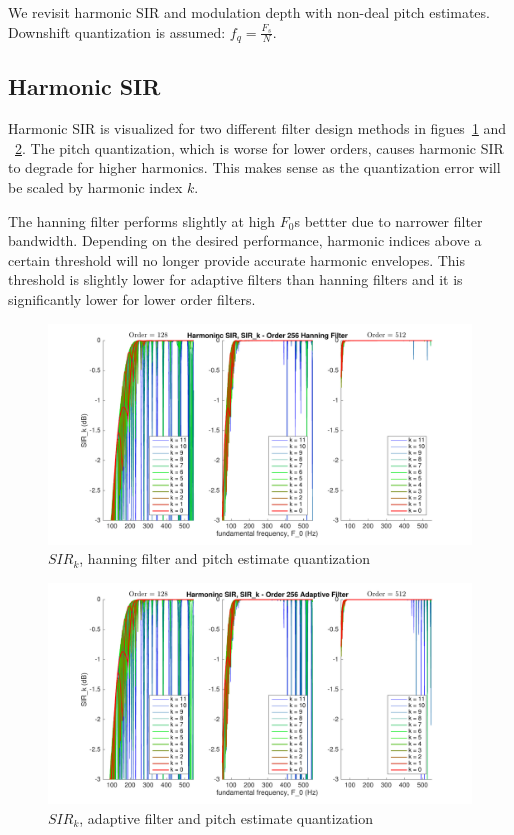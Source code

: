 \documentclass [11pt, proquest,oneside] {uwthesis}[2015/03/03]
\begin{document}
We revisit harmonic SIR and modulation depth with non-deal pitch estimates.  Downshift quantization is assumed: $f_q = \frac{F_s}{N}$.

\subsection{Harmonic SIR}

Harmonic SIR is visualized for two different filter design methods in figues~\ref{fig:pitch_sir_k_1} and ~\ref{fig:pitch_sir_k_2}.  The pitch quantization, which is worse for lower orders, causes harmonic SIR to degrade for higher harmonics.  This makes sense as the quantization error will be scaled by harmonic index $k$.

The hanning filter performs slightly at high $F_0$s bettter due to narrower filter bandwidth.  Depending on the desired performance, harmonic indices above a certain threshold will no longer provide accurate harmonic envelopes.  This threshold is slightly lower for adaptive filters than hanning filters and it is significantly lower for lower order filters.

\begin{figure}[!ht]
  \centering
    \includegraphics[width=1\textwidth]{pitch_sir_k_1}
    \caption{$SIR_k$, hanning filter and pitch estimate quantization}\label{fig:pitch_sir_k_1}
\end{figure}

\begin{figure}[!ht]
  \centering
    \includegraphics[width=1\textwidth]{pitch_sir_k_2}
    \caption{$SIR_k$, adaptive filter and pitch estimate quantization}\label{fig:pitch_sir_k_2}
\end{figure}
\end{document}
